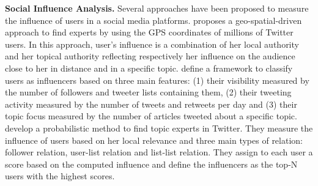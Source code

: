 \smallskip
\noindent\textbf{Social Influence Analysis.} 
Several approaches have been proposed 
to measure the influence of users in a social media platforms.
\cite{Cheng2014} proposes a geo-spatial-driven approach to find experts 
by using the GPS coordinates of millions of Twitter users. In this approach, user's influence
is a combination of her local authority and her topical authority reflecting respectively
her influence on the audience close to her in distance and in a specific topic.
\cite{Lehmann2013} define a framework to classify users as influencers 
based on three main features: (1) their visibility measured by the number of followers and tweeter
lists containing them, (2) their tweeting activity measured by the number of tweets and retweets 
per day and (3) their topic focus measured by the number of articles tweeted 
about a specific topic. 
\cite{wei2016learning} develop a probabilistic method to find topic experts in Twitter. They
measure the influence of users based on her local relevance and three main types of relation: 
follower relation, user-list relation and list-list relation. 
They assign to each user a score based on the computed influence and
define the influencers as the top-N users with the highest scores.
